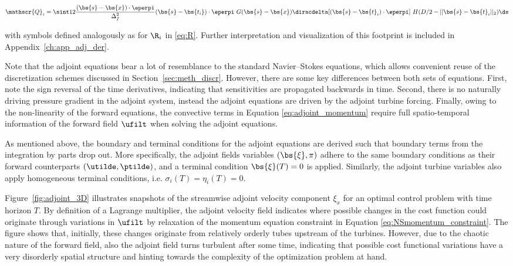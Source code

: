 	{\small
	\begin{equation}
		\mathscr{Q}_i = \sint 12 \frac{(\bs{s}-\bs{x})\cdot \eperpi}{\Delta_f^2} (\bs{s} - \bs{t_i})\cdot \eperpi \ G(\bs{s} - \bs{x}) \diracdelta [(\bs{s}-\bs{t}_i)\cdot\eperpi] ~ H(D/2-\vert\vert \bs{s}-\bs{t}_i\vert\vert_2) \ds
	\end{equation}
	}
	
	with symbols defined analogously as for $\R_i$ in \eqref{eq:R}. Further interpretation and visualization of this footprint is included in Appendix~\ref{ch:app_adj_der}. 
		
	Note that the adjoint equations bear a lot of resemblance to the standard Navier--Stokes equations, which allows convenient reuse of the discretization schemes discussed in Section~\ref{sec:meth_discr}. However, there are some key differences between both sets of equations. First, note the sign reversal of the time derivatives, indicating that sensitivities are propagated backwards in time. Second, there is no naturally driving pressure gradient in the adjoint system, instead the adjoint equations are driven by the adjoint turbine forcing. Finally, owing to the non-linearity of the forward equations, the convective terms in Equation \eqref{eq:adjoint_momentum} require full spatio-temporal information of the forward field $\ufilt$ when solving the adjoint equations.
	
	As mentioned above, the boundary and terminal conditions for the adjoint equations are derived such that boundary terms from the integration by parts drop out. More specifically, the adjoint fields variables $(\bs{\xi}, \pi)$ adhere to the same boundary conditions as their forward counterparts $(\utilde, \ptilde)$, and a terminal condition $\bs{\xi}(T) = 0$ is applied. Similarly, the adjoint turbine variables also apply homogeneous terminal conditions, i.e. $\sigma_i(T) = \eta_i(T) = 0$. 
	
	Figure~\ref{fig:adjoint_3D} illustrates snapshots of the streamwise adjoint velocity component $\xi_x$ for an optimal control problem with time horizon $T$. By definition of a Lagrange multiplier, the adjoint velocity field indicates where possible changes in the cost function could originate through variations in $\ufilt$ by relaxation of the momentum equation constraint in Equation \eqref{eq:NSmomentum_constraint}. The figure shows that, initially, these changes originate from relatively orderly tubes upstream of the turbines. However, due to the chaotic nature of the forward field, also the adjoint field turns turbulent after some time, indicating that possible cost functional variations have a very disorderly spatial structure and hinting towards the complexity of the optimization problem at hand.
	
